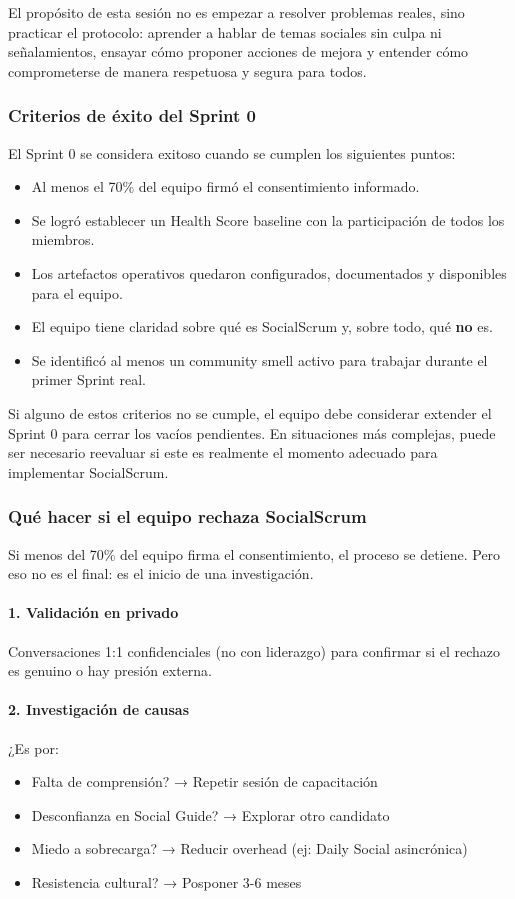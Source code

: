 El propósito de esta sesión no es empezar a resolver problemas reales, sino practicar el protocolo: aprender a hablar de temas sociales sin culpa ni señalamientos, ensayar cómo proponer acciones de mejora y entender cómo comprometerse de manera respetuosa y segura para todos.

\subsubsection{Criterios de éxito del Sprint 0}

El Sprint 0 se considera exitoso cuando se cumplen los siguientes puntos:

\begin{itemize}
    \item Al menos el 70\% del equipo firmó el consentimiento informado.
    \item Se logró establecer un Health Score baseline con la participación de todos los miembros.
    \item Los artefactos operativos quedaron configurados, documentados y disponibles para el equipo.
    \item El equipo tiene claridad sobre qué es SocialScrum y, sobre todo, qué \textbf{no} es.
    \item Se identificó al menos un community smell activo para trabajar durante el primer Sprint real.
\end{itemize}

Si alguno de estos criterios no se cumple, el equipo debe considerar extender el Sprint 0 para cerrar los vacíos pendientes. En situaciones más complejas, puede ser necesario reevaluar si este es realmente el momento adecuado para implementar SocialScrum.

\subsubsection{Qué hacer si el equipo rechaza SocialScrum}

Si menos del 70\% del equipo firma el consentimiento, el proceso se detiene. Pero eso no es el final: es el inicio de una investigación.

\paragraph{1. Validación en privado}
Conversaciones 1:1 confidenciales (no con liderazgo) para confirmar si el rechazo es genuino o hay presión externa.

\paragraph{2. Investigación de causas}
¿Es por:
\begin{itemize}
    \item Falta de comprensión? → Repetir sesión de capacitación
    \item Desconfianza en Social Guide? → Explorar otro candidato
    \item Miedo a sobrecarga? → Reducir overhead (ej: Daily Social asincrónica)
    \item Resistencia cultural? → Posponer 3-6 meses
\end{itemize}

